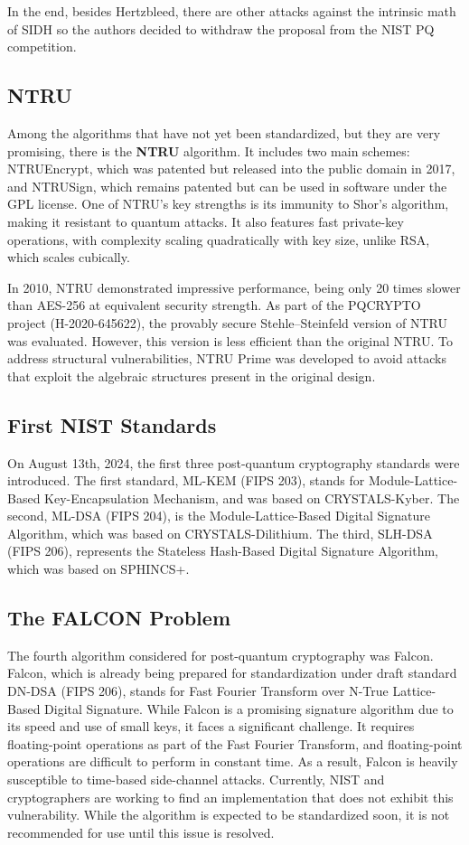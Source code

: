 In the end, besides Hertzbleed, there are other attacks against the
intrinsic math of SIDH so the authors decided to withdraw the proposal
from the NIST PQ competition.

\subsection{NTRU}
Among the algorithms that have not yet been standardized, but they are
very promising, there is the \textbf{NTRU} algorithm. 
It includes two main schemes: NTRUEncrypt, which was patented but
released into the public domain in 2017, and NTRUSign, which remains
patented but can be used in software under the GPL license. One of
NTRU's key strengths is its immunity to Shor's algorithm, making it
resistant to quantum attacks. It also features fast private-key
operations, with complexity scaling quadratically with key size,
unlike RSA, which scales cubically. 

In 2010, NTRU demonstrated impressive performance, being only 20 times
slower than AES-256 at equivalent security strength. As part of the
PQCRYPTO project (H-2020-645622), the provably secure Stehle–Steinfeld
version of NTRU was evaluated. However, this version is less efficient
than the original NTRU. To address structural vulnerabilities, NTRU
Prime was developed to avoid attacks that exploit the algebraic
structures present in the original design.

\subsection{First NIST Standards}

On August 13th, 2024, the first three post-quantum cryptography
standards were introduced. The first standard, ML-KEM (FIPS 203),
stands for Module-Lattice-Based Key-Encapsulation Mechanism, and was
based on CRYSTALS-Kyber. The second, ML-DSA (FIPS 204), is the
Module-Lattice-Based Digital Signature Algorithm, which was based on
CRYSTALS-Dilithium. The third, SLH-DSA (FIPS 206), represents the
Stateless Hash-Based Digital Signature Algorithm, which was based on
SPHINCS+.

\subsection{The FALCON Problem}
The fourth algorithm considered for post-quantum cryptography was
Falcon. Falcon, which is already being prepared for standardization
under draft standard DN-DSA (FIPS 206), stands for Fast Fourier
Transform over N-True Lattice-Based Digital Signature. While Falcon is
a promising signature algorithm due to its speed and use of small
keys, it faces a significant challenge. It requires floating-point
operations as part of the Fast Fourier Transform, and floating-point
operations are difficult to perform in constant time. As a result,
Falcon is heavily susceptible to time-based side-channel attacks.
Currently, NIST and cryptographers are working to find an
implementation that does not exhibit this vulnerability. While the
algorithm is expected to be standardized soon, it is not recommended
for use until this issue is resolved.

